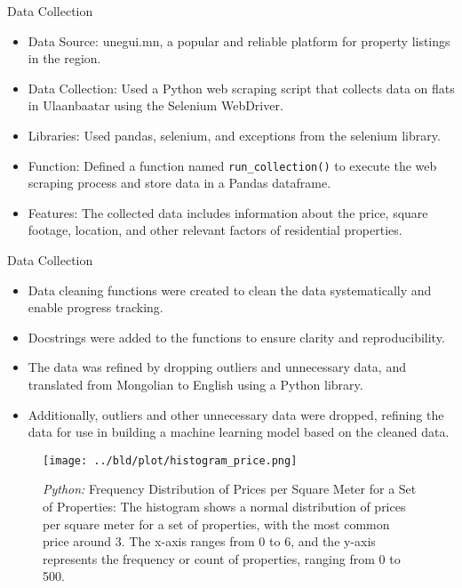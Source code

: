 \documentclass[11pt, aspectratio=169]{beamer}
\begin{document}
\begin{frame}{Data Collection}
    \begin{itemize}
        \item Data Source: unegui.mn, a popular and reliable platform for property listings in the region.
        \item Data Collection: Used a Python web scraping script that collects data on flats in Ulaanbaatar using the Selenium WebDriver.
        \item Libraries: Used pandas, selenium, and exceptions from the selenium library.
        \item Function: Defined a function named \texttt{run\_collection()} to execute the web scraping process and store data in a Pandas dataframe.
        \item Features: The collected data includes information about the price, square footage, location, and other relevant factors of residential properties.
    \end{itemize}
\end{frame}

\begin{frame}{Data Collection}
    \begin{itemize}
        \item Data cleaning functions were created to clean the data systematically and enable progress tracking.
        \item Docstrings were added to the functions to ensure clarity and reproducibility.
        \item The data was refined by dropping outliers and unnecessary data, and translated from Mongolian to English using a Python library.
        \item Additionally, outliers and other unnecessary data were dropped, refining the data for use in building a machine learning model based on the cleaned data.
    \end{itemize}
\end{frame}

\begin{frame}[t]
    \begin{figure}[H]

        \centering
        \texttt{[image: ../bld/plot/histogram\_price.png]}

        \caption{\emph{Python:} Frequency Distribution of Prices per Square Meter for a Set of Properties:
        The histogram shows a normal distribution of prices per square meter for a set of properties, with the most common price around 3.
        The x-axis ranges from 0 to 6, and the y-axis represents the frequency or count of properties, ranging from 0 to 500.}
        \label{fig:histogram_price}
    \end{figure}
\end{frame}
\end{document}
